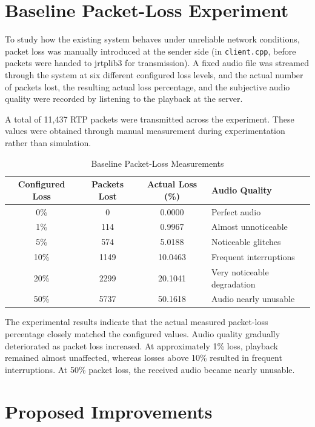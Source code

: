 \documentclass[conference]{IEEEtran}
\begin{document}
\section{Baseline Packet-Loss Experiment}

To study how the existing system behaves under unreliable network conditions, packet loss was manually introduced at the sender side (in \texttt{client.cpp}, before packets were handed to jrtplib3 for transmission). A fixed audio file was streamed through the system at six different configured loss levels, and the actual number of packets lost, the resulting actual loss percentage, and the subjective audio quality were recorded by listening to the playback at the server.

A total of 11,437 RTP packets were transmitted across the experiment. These values were obtained through manual measurement during experimentation rather than simulation.

\begin{table}[!t]
\caption{Baseline Packet-Loss Measurements}
\centering
\begin{tabular}{|c|c|c|l|}
\hline
Configured Loss & Packets Lost & Actual Loss (\%) & Audio Quality \\
\hline
0\% & 0 & 0.0000 & Perfect audio \\
1\% & 114 & 0.9967 & Almost unnoticeable \\
5\% & 574 & 5.0188 & Noticeable glitches \\
10\% & 1149 & 10.0463 & Frequent interruptions \\
20\% & 2299 & 20.1041 & Very noticeable degradation \\
50\% & 5737 & 50.1618 & Audio nearly unusable \\
\hline
\end{tabular}
\label{tab:baseline}
\end{table}

The experimental results indicate that the actual measured packet-loss percentage closely matched the configured values. Audio quality gradually deteriorated as packet loss increased. At approximately 1\% loss, playback remained almost unaffected, whereas losses above 10\% resulted in frequent interruptions. At 50\% packet loss, the received audio became nearly unusable.

\section{Proposed Improvements}
\end{document}
